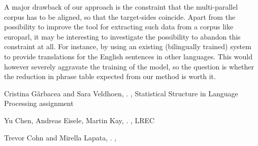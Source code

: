 \documentclass[11pt]{article}
\begin{document}
A major drawback of our approach is the constraint that the multi-parallel corpus has to be aligned, so that the target-sides coincide. Apart from the possibility to improve the tool for extracting such data from a corpus like europarl, it may be interesting to investigate the possibility to abandon this constraint at all. For instance, by using an existing (bilingually trained) system to provide translations for the English sentences in other languages. This would however severely aggravate the training of the model, so the question is whether the reduction in phrase table expected from our method is worth it.


\begin{thebibliography}{}

{Cristina G{\^a}rbacea and Sara Veldhoen},
.
,
\newblock Statistical Structure in Language Processing assignment

{Yu Chen, Andreas Eisele, Martin Kay},
.
,
\newblock LREC

{Trevor Cohn and Mirella Lapata},
.
,



\end{thebibliography}
\end{document}
